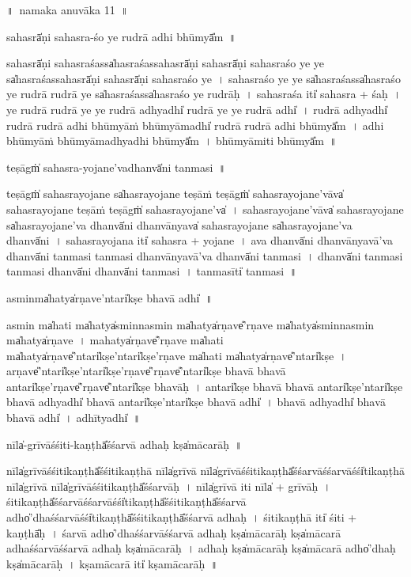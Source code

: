 \documentclass[parskip, DIV=14]{scrartcl}
\begin{document}
{%
\newpage
\LARGE
॥~namaka anuvāka 11~॥ 
\Large

sa॒hasrā̍ṇi sahasra॒-śo ye ru॒drā adhi॒ bhūmyā̎m~॥

sa॒hasrā̍ṇi sahasra॒śassa̍hasra॒śassa॒hasrā̍ṇi sa॒hasrā̍ṇi sahasra॒śo ye ye sa̍hasra॒śassa॒hasrā̍ṇi sa॒hasrā̍ṇi sahasra॒śo ye~।
sa॒ha॒sra॒śo ye ye sa̍hasra॒śassa̍hasra॒śo ye ru॒drā ru॒drā ye sa̍hasra॒śassa̍hasra॒śo ye ru॒drāḥ~।
sa॒ha॒sra॒śa iti̍ sahasra + śaḥ~।
ye ru॒drā ru॒drā ye ye ru॒drā adhyadhi̍ ru॒drā ye ye ru॒drā adhi̍~। %
ru॒drā adhyadhi̍ ru॒drā ru॒drā adhi॒ bhūmyā॒ṁ bhūmyā॒madhi̍ ru॒drā ru॒drā adhi॒ bhūmyā̎m~।
adhi॒ bhūmyā॒ṁ bhūmyā॒madhyadhi॒ bhūmyā̎m~।
bhūmyā॒miti॒ bhūmyā̎m~॥ 

teṣāgṁ̍ sahasra-yoja॒ne'va॒dhanvā̍ni tanmasi~॥

teṣāgṁ̍ sahasrayoja॒ne  sa̍hasrayoja॒ne teṣā॒ṁ teṣāgṁ̍ sahasrayoja॒ne'vāva̍ sahasrayoja॒ne teṣā॒ṁ teṣāgṁ̍ sahasrayoja॒ne'va̍~।
sa॒ha॒sra॒yo॒ja॒ne'vāva̍ sahasrayoja॒ne sa̍hasrayoja॒ne'va॒ dhanvā̍ni॒ dhanvā॒nyava̍ sahasrayoja॒ne sa̍hasrayoja॒ne'va॒ dhanvā̍ni~।
sa॒ha॒sra॒yo॒ja॒na iti̍ sahasra + yo॒ja॒ne~।
ava॒ dhanvā̍ni॒ dhanvā॒nyavā'va॒ dhanvā̍ni tanmasi tanmasi॒ dhanvā॒nyavā'va॒ dhanvā̍ni tanmasi~।
dhanvā̍ni tanmasi tanmasi॒ dhanvā̍ni॒ dhanvā̍ni tanmasi~।
ta॒nmasīti̍ tanmasi~॥  %

a॒sminma̍ha॒tya̍rṇa॒ve'ntari̍kṣe bha॒vā adhi̍~॥

a॒smin ma̍ha॒ti ma̍ha॒tya̍sminna॒smin ma̍ha॒tya̍rṇa॒ve̎'rṇa॒ve ma̍ha॒tya̍sminna॒smin ma̍ha॒tya̍rṇa॒ve~। %
ma॒ha॒tya̍rṇa॒ve̎'rṇa॒ve ma̍ha॒ti ma̍ha॒tya̍rṇa॒ve̎'ntari̍kṣe॒'ntari̍kṣe'rṇa॒ve ma̍ha॒ti ma̍ha॒tya̍rṇa॒ve̎'ntari̍kṣe~।
a॒rṇa॒ve̎'ntari̍kṣe॒'ntari̍kṣe'rṇa॒ve̎'rṇa॒ve̎'ntari̍kṣe bha॒vā bha॒vā a॒ntari̍kṣe'rṇa॒ve̎'rṇa॒ve̎'ntari̍kṣe bha॒vāḥ~।
antari̍kṣe bha॒vā bha॒vā a॒ntari̍kṣe॒'ntari̍kṣe bha॒vā adhyadhi̍ bha॒vā a॒ntari̍kṣe॒'ntari̍kṣe bha॒vā adhi̍~।
bha॒vā adhyadhi̍ bha॒vā bha॒vā adhi̍~। %
adhītyadhi̍~॥ %


nīla̍-grīvāśśiti॒-kaṇṭhā̎śśa॒rvā a॒dhaḥ kṣa̍māca॒rāḥ~॥

nīla̍grīvāśśiti॒kaṇṭhā̎śśiti॒kaṇṭhā॒ nīla̍grīvā॒ nīla̍grīvāśśiti॒kaṇṭhā̎śśa॒rvāśśa॒rvāśśi̍ti॒kaṇṭhā॒ nīla̍grīvā॒ nīla̍grīvāśśiti॒kaṇṭhā̎śśa॒rvāḥ~।
nīla̍grīvā॒ iti॒ nīla̍ + grī॒vā॒ḥ॒~।
śi॒ti॒kaṇṭhā̎śśa॒rvāśśa॒rvāśśi̍ti॒kaṇṭhā̎śśiti॒kaṇṭhā̎śśa॒rvā a॒dho̍'dhaśśa॒rvāśśi̍ti॒kaṇṭhā̎śśiti॒kaṇṭhā̎śśa॒rvā a॒dhaḥ~।
śi॒ti॒kaṇṭhā॒ iti̍ śiti + kaṇṭhā̎ḥ~।
śa॒rvā a॒dho̍'dhaśśa॒rvāśśa॒rvā a॒dhaḥ kṣa̍māca॒rāḥ kṣa̍māca॒rā a॒dhaśśa॒rvāśśa॒rvā a॒dhaḥ kṣa̍māca॒rāḥ~।
a॒dhaḥ kṣa̍māca॒rāḥ kṣa̍māca॒rā a॒dho̍'dhaḥ kṣa̍māca॒rāḥ~।
kṣa॒mā॒ca॒rā iti̍ kṣamāca॒rāḥ~॥

}
\end{document}
